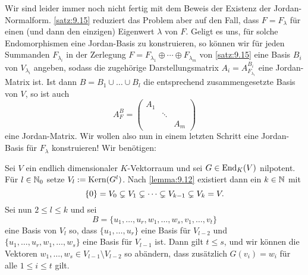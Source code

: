 \begin{bemerkung}
	\label{bem:9.16}
	Wir sind leider immer noch nicht fertig mit dem Beweis der Existenz der Jordan-Normalform.
	\autoref{satz:9.15} reduziert das Problem aber auf den Fall, dass $F = F_\lambda$ für einen (und dann den einzigen) Eigenwert $\lambda$ von $F$.
	Geligt es uns, für solche Endomorphismen eine Jordan-Basis zu konstruieren, so können wir für jeden Summanden $F_{\lambda_i}$ in der Zerlegung $F = F_{\lambda_1} \oplus \cdots \oplus F_{\lambda_m}$ von \autoref{satz:9.15} eine Basis $B_i$ von $V_{\lambda_i}$ angeben, sodass die zugehörige Darstellungsmatrix $A_i = A^{B_i}_{F_{\lambda_i}}$ eine Jordan-Matrix ist.
	Ist dann $B = B_1 \cup \dots \cup B_l$ die entsprechend zusammengesetzte Basis von $V$, so ist auch
	\[
		A_F^B = \begin{pmatrix}
			A_1 & & \\
			 & \ddots & \\
			 & & A_m
		\end{pmatrix}
	\]
	eine Jordan-Matrix.
	Wir wollen also nun in einem letzten Schritt eine Jordan-Basis für $F_\lambda$ konstruieren! Wir benötigen:
\end{bemerkung}

\begin{lemma}
	\label{lemma:9.17}
	Sei $V$ ein endlich dimensionaler $K$-Vektorraum und sei $G \in \operatorname{End}_K(V)$ nilpotent.
	Für $l \in \mathbb{N}_0$ setze $V_l := \operatorname{Kern}(G^l)$.
	Nach \autoref{lemma:9.12} existiert dann ein $k \in \mathbb{N}$ mit
	\[
		\{0\} = V_0 \subsetneq V_1 \subsetneq \cdots \subsetneq V_{k-1} \subsetneq V_k = V.
	\]
	Sei nun $2 \leq l \leq k$ und sei
	\[
		B = \{u_1,\dots,u_r,w_1,\dots,w_s,v_1,\dots,v_t\}
	\]
	eine Basis von $V_l$ so, dass $\{u_1,\dots,u_r\}$ eine Basis für $V_{l-2}$ und $\{u_1,\dots,u_r,w_1,\dots,w_s\}$ eine Basis für $V_{l-1}$ ist.
	Dann gilt $t \leq s$, und wir können die Vektoren $w_1,\dots,w_s \in V_{l-1} \setminus V_{l-2}$ so abändern, dass zusätzlich $G(v_i) = w_i$ für alle $1 \leq i \leq t$ gilt.
\end{lemma}


